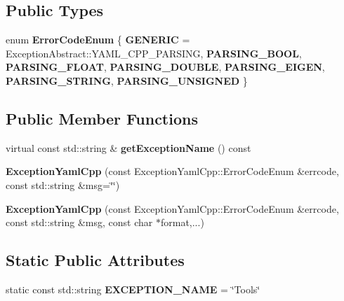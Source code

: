 \subsection*{Public Types}
\begin{DoxyCompactItemize}
\item 
\mbox{\label{classdynamic__graph_1_1ExceptionYamlCpp_aaf84f3285b4c635c35cd39aba7ac9a5a}} 
enum {\bfseries Error\+Code\+Enum} \{ \newline
{\bfseries G\+E\+N\+E\+R\+IC} = Exception\+Abstract\+:\+:Y\+A\+M\+L\+\_\+\+C\+P\+P\+\_\+\+P\+A\+R\+S\+I\+NG, 
{\bfseries P\+A\+R\+S\+I\+N\+G\+\_\+\+B\+O\+OL}, 
{\bfseries P\+A\+R\+S\+I\+N\+G\+\_\+\+F\+L\+O\+AT}, 
{\bfseries P\+A\+R\+S\+I\+N\+G\+\_\+\+D\+O\+U\+B\+LE}, 
\newline
{\bfseries P\+A\+R\+S\+I\+N\+G\+\_\+\+E\+I\+G\+EN}, 
{\bfseries P\+A\+R\+S\+I\+N\+G\+\_\+\+S\+T\+R\+I\+NG}, 
{\bfseries P\+A\+R\+S\+I\+N\+G\+\_\+\+U\+N\+S\+I\+G\+N\+ED}
 \}
\end{DoxyCompactItemize}
\subsection*{Public Member Functions}
\begin{DoxyCompactItemize}
\item 
\mbox{\label{classdynamic__graph_1_1ExceptionYamlCpp_aa0d7f34b8b246a8d23ce1eda5d79b80c}} 
virtual const std\+::string \& {\bfseries get\+Exception\+Name} () const
\item 
\mbox{\label{classdynamic__graph_1_1ExceptionYamlCpp_ae6dc871402ab15a7af2181d3b2e5bc5e}} 
{\bfseries Exception\+Yaml\+Cpp} (const Exception\+Yaml\+Cpp\+::\+Error\+Code\+Enum \&errcode, const std\+::string \&msg=\char`\"{}\char`\"{})
\item 
\mbox{\label{classdynamic__graph_1_1ExceptionYamlCpp_a823359f3d24ad6930042d4d5c2443988}} 
{\bfseries Exception\+Yaml\+Cpp} (const Exception\+Yaml\+Cpp\+::\+Error\+Code\+Enum \&errcode, const std\+::string \&msg, const char $\ast$format,...)
\end{DoxyCompactItemize}
\subsection*{Static Public Attributes}
\begin{DoxyCompactItemize}
\item 
\mbox{\label{classdynamic__graph_1_1ExceptionYamlCpp_a7d19bc2c6d36d26bd878795ea00bc63f}} 
static const std\+::string {\bfseries E\+X\+C\+E\+P\+T\+I\+O\+N\+\_\+\+N\+A\+ME} = \char`\"{}Tools\char`\"{}
\end{DoxyCompactItemize}
